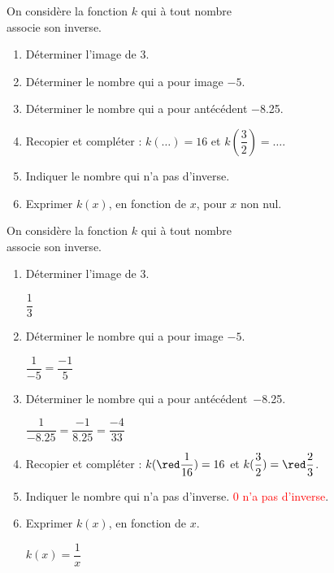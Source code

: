 \begin{exercice}
    On considère la fonction $k$ qui à tout nombre \\associe son inverse.
    \begin{enumerate}
        \item Déterminer l'image de $3$.
        \item Déterminer le nombre qui a pour image $-5$.
        \item Déterminer le nombre qui a pour antécédent \num{-8.25}.
        \item Recopier et compléter : $k(\dots{})=16$ et $k(\dfrac{3}{2})=\dots{}$.
        \item Indiquer le nombre qui n'a pas d'inverse.
        \item Exprimer $k(x)$, en fonction de $x$, pour $x$ non nul.
    \end{enumerate}
\end{exercice}
\begin{corrige}
    On considère la fonction $k$ qui à tout nombre \\associe son inverse.

    \begin{enumerate}
        \item Déterminer l'image de $3$.
        
        \smallskip
        {\red $\dfrac{1}{3}$}
        \smallskip
        \item Déterminer le nombre qui a pour image $-5$.
        
        \smallskip
        {\red $\dfrac{1}{-5}=\dfrac{-1}{5}$}
        \smallskip
    \end{enumerate}
    \Coupe
    \begin{enumerate}
    \setcounter{enumi}{2}
        \item Déterminer le nombre qui a pour \hbox{antécédent \num{-8.25}.}
        
        {\red $\dfrac{1}{\num{-8.25}}=\dfrac{-1}{\num{8.25}}=\dfrac{-4}{33}$}
        \item Recopier et compléter : $k({\red \dfrac{1}{16}})=16$ et $k(\dfrac{3}{2})={\red \dfrac{2}{3}}$.
        \item Indiquer le nombre qui n'a pas d'inverse. \textcolor{red}{$0$ n'a pas d'inverse}.
        \item Exprimer $k(x)$, en fonction de $x$.
        
        {\red $k(x)=\dfrac{1}{x}$}
    \end{enumerate}
\end{corrige}
